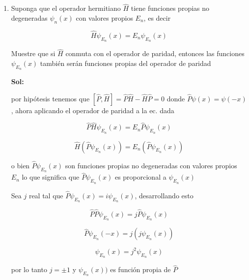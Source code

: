 \documentclass[12pt,a4paper]{article}
\begin{document}
\begin{enumerate}
    
    
    
    
    
    
    \item Suponga que el operador hermitiano $\hat{H}$ tiene funciones propias no degeneradas $\psi_{n}(x)$ con valores propios $E_n$, es decir
    
    \begin{equation*}
        \hat{H}\psi_{E_n}(x) =E_{n}\psi_{E_n}(x)
    \end{equation*}
    
    Muestre que si $\hat{H}$ conmuta con el operador de paridad, entonces las funciones $\psi_{E_n}(x)$ también serán funciones propias del operador de paridad
    
    \textbf{Sol:}
    
    por hipótesis tenemos que $[\hat{P},\hat{H}] =\hat{P} \hat{H} - \hat{H}\hat{P} = 0$ donde $\hat{P} \psi(x) = \psi(-x) $, ahora aplicando el operador de paridad a la ec. dada
    
    \begin{equation*}
        \hat{P}\hat{H}\psi_{E_n}(x) =E_{n}\hat{P}\psi_{E_n}(x)
    \end{equation*}
    
    \begin{equation*}
        \hat{H}( \hat{P}\psi_{E_n}(x)) =E_{n}(\hat{P}\psi_{E_n}(x))
    \end{equation*}
    
    o bien $\hat{P}\psi_{E_n}(x)$ son funciones propias no degeneradas con valores propios $E_n$ lo que significa que $\hat{P}\psi_{E_n}(x)$ es proporcional a $\psi_{E_n}(x)$ 
    
    Sea $j$ real tal que $\hat{P}\psi_{E_n}(x) = i \psi_{E_n}(x)$, desarrollando esto
    
    \begin{equation*}
        \hat{P}\hat{P}\psi_{E_n}(x) = j\hat{P} \psi_{E_n}(x)
    \end{equation*}
    
    \begin{equation*}
        \hat{P}\psi_{E_n}(-x) = j(j \psi_{E_n}(x))
    \end{equation*}
    
    \begin{equation*}
        \psi_{E_n}(x) = j^2 \psi_{E_n}(x)
    \end{equation*}
    
    por lo tanto $j = \pm 1$ y $\psi_{E_n}(x))$ es función propia de $\hat{P}$
    

\end{enumerate}
\end{document}
